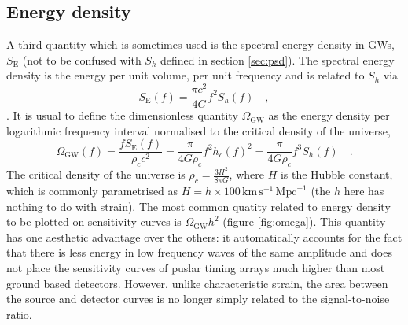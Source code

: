 \subsection{Energy density}
A third quantity which is sometimes used is the spectral energy density in GWs, $S_{\textrm{E}}$ (not to be confused with $S_{h}$ defined in section \ref{sec:psd}). The spectral energy density is the energy per unit volume, per unit frequency and is related to $S_{h}$ via
\begin{equation}\label{eq:spectralenergydensity} S_{\textrm{E}}(f)=\frac{\pi c^{2}}{4G} f^{2}S_{h}(f) \quad , \end{equation}
\cite{HellingsDowns}. It is usual to define the dimensionless quantity $\Omega_{\textrm{GW}}$ as the energy density per logarithmic frequency interval normalised to the critical density of the universe,
\begin{equation}\label{eq:omega} 
\Omega_{\textrm{GW}}(f)=\frac{fS_{\textrm{E}}(f)}{\rho_{c}c^{2}}=\frac{\pi}{4G\rho_{c}}f^{2}h_{c}(f)^{2}=\frac{\pi}{4G\rho_{c}}f^{3}S_{h}(f)  \quad .
\end{equation}
The critical density of the universe is $\rho_{c}=\frac{3H^{2}}{8\pi G}$, where $H$ is the Hubble constant, which is commonly parametrised as $H=h\times 100\, \textrm{km}\,\textrm{s}^{-1}\,\textrm{Mpc}^{-1}$ (the $h$ here has nothing to do with strain). The most common quatity related to energy density to be plotted on sensitivity curves is $\Omega_{\textrm{GW}}h^{2}$ (figure \ref{fig:omega}). This quantity has one aesthetic advantage over the others: it automatically accounts for the fact that there is less energy in low frequency waves of the same amplitude and does not place the sensitivity curves of puslar timing arrays much higher than most ground based detectors. However, unlike characteristic strain, the area between the source and detector curves is no longer simply related to the signal-to-noise ratio.


